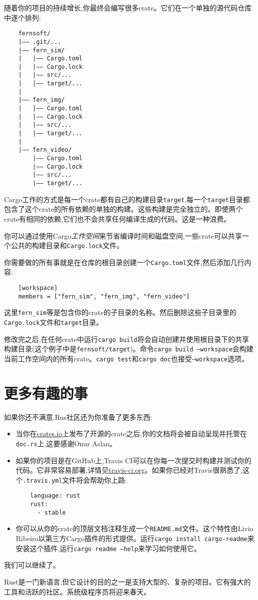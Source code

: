 随着你的项目的持续增长,你最终会编写很多crate。它们在一个单独的源代码仓库中逐个排列:
\begin{verbatim}
    fernsoft/
    |—— .git/...
    |—— fern_sim/
    |   |—— Cargo.toml
    |   |—— Cargo.lock
    |   |—— src/...
    |   |—— target/...
    |
    |—— fern_img/
    |   |—— Cargo.toml
    |   |—— Cargo.lock
    |   |—— src/...
    |   |—— target/...
    |
    |—— fern_video/
        |—— Cargo.toml
        |—— Cargo.lock
        |—— src/...
        |—— target/...
\end{verbatim}

Cargo工作的方式是每一个crate都有自己的构建目录\texttt{target},每一个\texttt{target}目录都包含了这个crate的所有依赖的单独的构建。这些构建是完全独立的。即使两个crate有相同的依赖,它们也不会共享任何编译生成的代码。这是一种浪费。

你可以通过使用Cargo\emph{工作空间}来节省编译时间和磁盘空间,一些crate可以共享一个公共的构建目录和\texttt{Cargo.lock}文件。

你需要做的所有事就是在仓库的根目录创建一个\texttt{Cargo.toml}文件,然后添加几行内容:
\begin{verbatim}
    [workspace]
    members = ["fern_sim", "fern_img", "fern_video"]
\end{verbatim}
这里\texttt{fern\_sim}等是包含你的crate的子目录的名称。然后删除这些子目录里的\texttt{Cargo.lock}文件和\texttt{target}目录。

修改完之后,在任何crate中运行\texttt{cargo build}将会自动创建并使用根目录下的共享构建目录(这个例子中是\texttt{fernsoft/target})。命令\texttt{cargo build --workspace}会构建当前工作空间内的所有crate。\texttt{cargo test}和\texttt{cargo doc}也接受\texttt{--workspace}选项。

\section{更多有趣的事}

如果你还不满意,Rus社区还为你准备了更多东西:
\begin{itemize}
    \item 当你在\href{https://crates.io}{crates.io}上发布了开源的crate之后,你的文档将会被自动呈现并托管在\texttt{doc.rs}上,这要感谢Onur Aslan。
    \item 如果你的项目是在GitHub上,Travis CI可以在你每一次提交时构建并测试你的代码。它非常容易部署,详情见\href{https://travis-ci.org}{travis-ci.org}。如果你已经对Travis很熟悉了,这个\texttt{.travis.yml}文件将会帮助你上路:
    \begin{verbatim}
    language: rust
    rust:
      - stable
    \end{verbatim}
    \item 你可以从你的crate的顶层文档注释生成一个\texttt{README.md}文件。这个特性由Livio Ribeiro以第三方Cargo插件的形式提供。运行\texttt{cargo install cargo-readme}来安装这个插件,运行\texttt{cargo readme --help}来学习如何使用它。
\end{itemize}

我们可以继续了。

Rust是一门新语言,但它设计的目的之一是支持大型的、复杂的项目。它有强大的工具和活跃的社区。系统级程序员将迎来春天。
